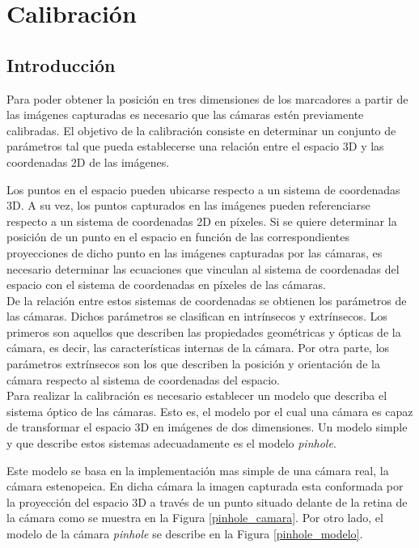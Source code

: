 \chapter{Calibración}\label{calibracion}


\section{Introducción}
Para poder obtener la posición en tres dimensiones de los marcadores a partir de las imágenes capturadas es necesario que las cámaras estén previamente calibradas. El objetivo de la calibración consiste en determinar un conjunto de parámetros tal que pueda establecerse una relación entre el espacio 3D y las coordenadas 2D de las imágenes.\\
\vspace{-0.1cm}


Los puntos en el espacio pueden ubicarse respecto a un sistema de coordenadas 3D. A su vez, los puntos capturados en las imágenes pueden referenciarse respecto a un sistema de coordenadas 2D en píxeles. Si se quiere determinar la posición de un punto en el espacio en función de las correspondientes proyecciones de dicho punto en las imágenes capturadas por las cámaras, es necesario determinar las ecuaciones que vinculan al sistema de coordenadas del espacio con el sistema de coordenadas en píxeles de las cámaras.\\

De la relación entre estos sistemas de coordenadas se obtienen los parámetros de las cámaras. Dichos parámetros se clasifican en intrínsecos y extrínsecos. Los primeros son aquellos que describen las propiedades geométricas y ópticas de la cámara, es decir, las características internas de la cámara. Por otra parte, los parámetros extrínsecos son los que describen la posición y orientación de la cámara respecto al sistema de coordenadas del espacio.\\ 

Para realizar la calibración es necesario establecer un modelo que describa el sistema óptico de las cámaras. Esto es, el modelo por el cual una cámara es capaz de transformar el espacio 3D en imágenes de dos dimensiones. Un modelo simple y que describe estos sistemas adecuadamente es el modelo \textit{pinhole}.

Este modelo se basa en la implementación mas simple de una cámara real, la cámara estenopeica. En dicha cámara la imagen capturada esta conformada por la proyección del espacio 3D a través de un punto situado delante de la retina de la cámara como se muestra en la Figura \ref{pinhole_camara}. Por otro lado, el modelo de la cámara \textit{pinhole} se describe en la Figura \ref{pinhole_modelo}.\\


